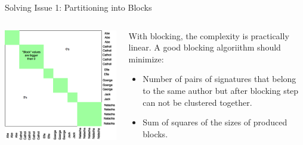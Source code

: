 \documentclass{beamer}
\begin{document}
\begin{frame} {Solving Issue 1: Partitioning into Blocks}


\begin{columns}[T]

\begin{column}{0.5\textwidth}
\includegraphics[width=\textwidth]{./figures/blocking.png}
\end{column}
\begin{column}{0.5\textwidth}

With blocking, the complexity is practically linear. A good blocking algoriithm
should minimize:
\begin{itemize}


\item Number of pairs of signatures that belong to the same author but
after blocking step can not be clustered together. 
\item Sum of squares of the sizes of produced blocks.

\end{itemize}

\end{column}

\end{columns}

\end{frame}
\end{document}

